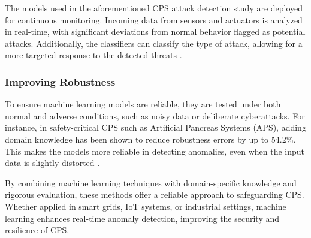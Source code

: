 The models used in the aforementioned CPS attack detection study are deployed for continuous monitoring. Incoming data from sensors and actuators is analyzed in real-time, with significant deviations from normal behavior flagged as potential attacks. Additionally, the classifiers can classify the type of attack, allowing for a more targeted response to the detected threats \cite{92}.

\subsubsection{Improving Robustness}

To ensure machine learning models are reliable, they are tested under both normal and adverse conditions, such as noisy data or deliberate cyberattacks. For instance, in safety-critical CPS such as Artificial Pancreas Systems (APS), adding domain knowledge has been shown to reduce robustness errors by up to 54.2\%. This makes the models more reliable in detecting anomalies, even when the input data is slightly distorted \cite{63}.

By combining machine learning techniques with domain-specific knowledge and rigorous evaluation, these methods offer a reliable approach to safeguarding CPS. Whether applied in smart grids, IoT systems, or industrial settings, machine learning enhances real-time anomaly detection, improving the security and resilience of CPS.


